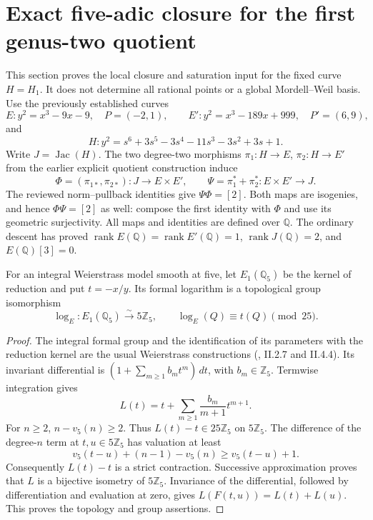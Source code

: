\section{Exact five-adic closure for the first genus-two quotient}
\label{sec-padic-closure}

This section proves the local closure and saturation input for the
fixed curve \(H=H_1\). It does not determine all rational points or a
global Mordell--Weil basis. Use the previously established curves
\[
 E:y^2=x^3-9x-9,\quad P=(-2,1),\qquad
 E':y^2=x^3-189x+999,\quad P'=(6,9),
\]
and
\[
 H:y^2=s^6+3s^5-3s^4-11s^3-3s^2+3s+1.
\]
Write \(J=\operatorname{Jac}(H)\). The two degree-two morphisms
\(\pi_1:H\to E\), \(\pi_2:H\to E'\) from the earlier explicit
quotient construction induce
\[
 \Phi=(\pi_{1*},\pi_{2*}):J\longrightarrow E\times E',\qquad
 \Psi=\pi_1^*+\pi_2^*:E\times E'\longrightarrow J.
\]
The reviewed norm--pullback identities give \(\Psi\Phi=[2]\).
Both maps are isogenies, and hence \(\Phi\Psi=[2]\) as well:
compose the first identity with \(\Phi\) and use its geometric
surjectivity. All maps and identities are defined over \(\mathbb Q\).
The ordinary descent has proved
\(\operatorname{rank}E(\mathbb Q)=\operatorname{rank}E'(\mathbb Q)=1\),
\(\operatorname{rank}J(\mathbb Q)=2\), and \(E(\mathbb Q)[3]=0\).

\begin{lemma}\label{ql-formal-log}
For an integral Weierstrass model smooth at five, let \(E_1(\mathbb Q_5)\)
be the kernel of reduction and put \(t=-x/y\). Its formal logarithm is
a topological group isomorphism
\[
 \log_E:E_1(\mathbb Q_5)\xrightarrow{\sim}5\mathbb Z_5,
 \qquad \log_E(Q)\equiv t(Q)\pmod {25}.
\]
\end{lemma}
\begin{proof}
The integral formal group and the identification of its parameters with
the reduction kernel are the usual Weierstrass constructions
(\cite{MilneEC2Descent}, II.2.7 and II.4.4). Its invariant differential is
\((1+\sum_{m\geq1}b_mt^m)\,dt\), with \(b_m\in\mathbb Z_5\).
Termwise integration gives
\[
 L(t)=t+\sum_{m\geq1}\frac{b_m}{m+1}t^{m+1}.
\]
For \(n\geq2\), \(n-v_5(n)\geq2\). Thus \(L(t)-t\in25\mathbb Z_5\)
on \(5\mathbb Z_5\). The difference of the degree-\(n\) term at
\(t,u\in5\mathbb Z_5\) has valuation at least
\[
 v_5(t-u)+(n-1)-v_5(n)\geq v_5(t-u)+1.
\]
Consequently \(L(t)-t\) is a strict contraction. Successive
approximation proves that \(L\) is a bijective isometry of
\(5\mathbb Z_5\). Invariance of the differential, followed by
differentiation and evaluation at zero, gives
\(L(F(t,u))=L(t)+L(u)\). This proves the topology and group assertions.
\end{proof}

